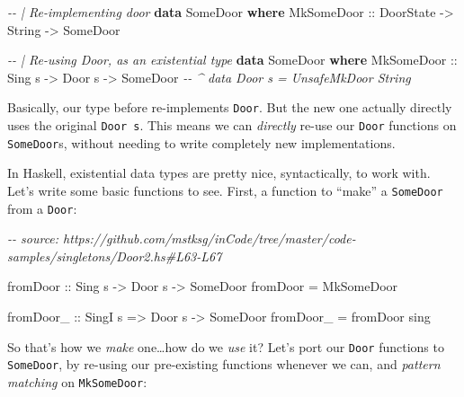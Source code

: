 \documentclass[]{article}
\newenvironment{Shaded}{}{}
\newcommand{\CommentTok}[1]{\textcolor[rgb]{0.38,0.63,0.69}{\textit{#1}}}
\newcommand{\DataTypeTok}[1]{\textcolor[rgb]{0.56,0.13,0.00}{#1}}
\newcommand{\KeywordTok}[1]{\textcolor[rgb]{0.00,0.44,0.13}{\textbf{#1}}}
\newcommand{\NormalTok}[1]{#1}
\newcommand{\OtherTok}[1]{\textcolor[rgb]{0.00,0.44,0.13}{#1}}
\begin{document}
\begin{Shaded}
\begin{Highlighting}[]
\CommentTok{{-}{-} | Re{-}implementing door}
\KeywordTok{data} \DataTypeTok{SomeDoor} \KeywordTok{where}
    \DataTypeTok{MkSomeDoor}\OtherTok{ ::} \DataTypeTok{DoorState} \OtherTok{{-}>} \DataTypeTok{String} \OtherTok{{-}>} \DataTypeTok{SomeDoor}

\CommentTok{{-}{-} | Re{-}using Door, as an existential type}
\KeywordTok{data} \DataTypeTok{SomeDoor} \KeywordTok{where}
    \DataTypeTok{MkSomeDoor}\OtherTok{  ::} \DataTypeTok{Sing}\NormalTok{ s  }\OtherTok{{-}>} \DataTypeTok{Door}\NormalTok{ s }\OtherTok{{-}>} \DataTypeTok{SomeDoor}
                            \CommentTok{{-}{-} \^{} data Door s = UnsafeMkDoor String}
\end{Highlighting}
\end{Shaded}

Basically, our type before re-implements \texttt{Door}. But the new one actually
directly uses the original \texttt{Door\ s}. This means we can \emph{directly}
re-use our \texttt{Door} functions on \texttt{SomeDoor}s, without needing to
write completely new implementations.

In Haskell, existential data types are pretty nice, syntactically, to work with.
Let's write some basic functions to see. First, a function to ``make'' a
\texttt{SomeDoor} from a \texttt{Door}:

\begin{Shaded}
\begin{Highlighting}[]
\CommentTok{{-}{-} source: https://github.com/mstksg/inCode/tree/master/code{-}samples/singletons/Door2.hs\#L63{-}L67}

\OtherTok{fromDoor ::} \DataTypeTok{Sing}\NormalTok{ s }\OtherTok{{-}>} \DataTypeTok{Door}\NormalTok{ s }\OtherTok{{-}>} \DataTypeTok{SomeDoor}
\NormalTok{fromDoor }\OtherTok{=} \DataTypeTok{MkSomeDoor}

\OtherTok{fromDoor\_ ::} \DataTypeTok{SingI}\NormalTok{ s }\OtherTok{=>} \DataTypeTok{Door}\NormalTok{ s }\OtherTok{{-}>} \DataTypeTok{SomeDoor}
\NormalTok{fromDoor\_ }\OtherTok{=}\NormalTok{ fromDoor sing}
\end{Highlighting}
\end{Shaded}

So that's how we \emph{make} one\ldots how do we \emph{use} it? Let's port our
\texttt{Door} functions to \texttt{SomeDoor}, by re-using our pre-existing
functions whenever we can, and \emph{pattern matching} on \texttt{MkSomeDoor}:
\end{document}
